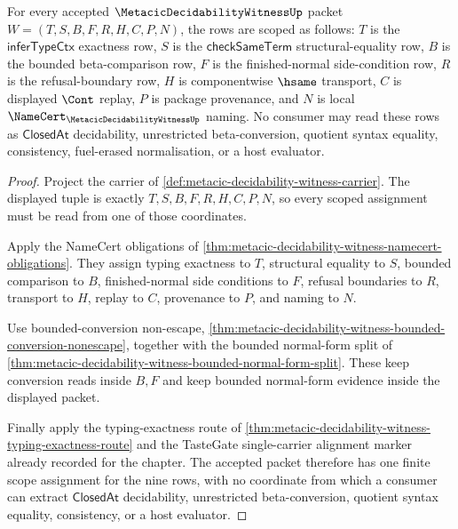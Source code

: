 \begin{theorem}
\label{thm:metacic-decidability-witness-scope-assignment}
For every accepted $\MetacicDecidabilityWitnessUp$ packet $W=(T,S,B,F,R,H,C,P,N)$, the rows are scoped as follows: $T$ is the $\mathsf{inferTypeCtx}$ exactness row, $S$ is the $\mathsf{checkSameTerm}$ structural-equality row, $B$ is the bounded beta-comparison row, $F$ is the finished-normal side-condition row, $R$ is the refusal-boundary row, $H$ is componentwise $\hsame$ transport, $C$ is displayed $\Cont$ replay, $P$ is package provenance, and $N$ is local $\NameCert_{\MetacicDecidabilityWitnessUp}$ naming. No consumer may read these rows as $\mathsf{ClosedAt}$ decidability, unrestricted beta-conversion, quotient syntax equality, consistency, fuel-erased normalisation, or a host evaluator.
\end{theorem}
\begin{proof}
Project the carrier of \autoref{def:metacic-decidability-witness-carrier}. The displayed tuple is exactly $T,S,B,F,R,H,C,P,N$, so every scoped assignment must be read from one of those coordinates.

Apply the NameCert obligations of \autoref{thm:metacic-decidability-witness-namecert-obligations}. They assign typing exactness to $T$, structural equality to $S$, bounded comparison to $B$, finished-normal side conditions to $F$, refusal boundaries to $R$, transport to $H$, replay to $C$, provenance to $P$, and naming to $N$.

Use bounded-conversion non-escape, \autoref{thm:metacic-decidability-witness-bounded-conversion-nonescape}, together with the bounded normal-form split of \autoref{thm:metacic-decidability-witness-bounded-normal-form-split}. These keep conversion reads inside $B,F$ and keep bounded normal-form evidence inside the displayed packet.

Finally apply the typing-exactness route of \autoref{thm:metacic-decidability-witness-typing-exactness-route} and the TasteGate single-carrier alignment marker already recorded for the chapter. The accepted packet therefore has one finite scope assignment for the nine rows, with no coordinate from which a consumer can extract $\mathsf{ClosedAt}$ decidability, unrestricted beta-conversion, quotient syntax equality, consistency, or a host evaluator.
\end{proof}

